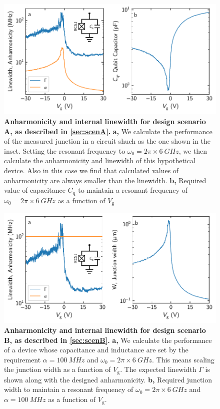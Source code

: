 \begin{figure}[]
	\centering
	\includegraphics[width=.9\linewidth]{chapter-gJJ/figs/supp_anharmonicity_2.pdf}
	\caption{{\bf Anharmonicity and internal linewidth for design scenario A, as described in \ref{sec:scenA}.}
		\textbf{a,} We calculate the performance of the measured junction in a circuit shuch as the one shown in the inset.
		Setting the resonant frequency to $\omega_0 = 2\pi\times\SI{6}{GHz}$, we then calculate the anharmonicity and linewidth of this hypothetical device.
		Also in this case we find that calculated values of anharmonicity are always smaller than the linewidth.
		\textbf{b,} Required value of capacitance $C_\text{q}$ to maintain a resonant frequency of $\omega_0 = 2\pi\times\SI{6}{GHz}$ as a function of $V_\text{g}$}
	\label{fig:anharm2}
\end{figure}

\begin{figure}[]
	\centering
	\includegraphics[width=.9\linewidth]{chapter-gJJ/figs/supp_anharmonicity_3.pdf}
	\caption{{\bf Anharmonicity and internal linewidth for design scenario B, as described in \ref{sec:scenB}.}
		\textbf{a,} We calculate the performance of a device whose capacitance and inductance are set by the requirement $\alpha = \SI{100}{MHz}$ and $\omega_0 = 2\pi\times\SI{6}{GHz}$.  This means scaling the junction width as a function of $V_\text{g}$.  The expected linewidth $\Gamma$ is shown along with the designed anharmonicity.
		\textbf{b,} Required junction width to maintain a resonant frequency of $\omega_0 = 2\pi\times\SI{6}{GHz}$ and $\alpha = \SI{100}{MHz}$ as a function of $V_\text{g}$.}
	\label{fig:anharm3}
\end{figure}

